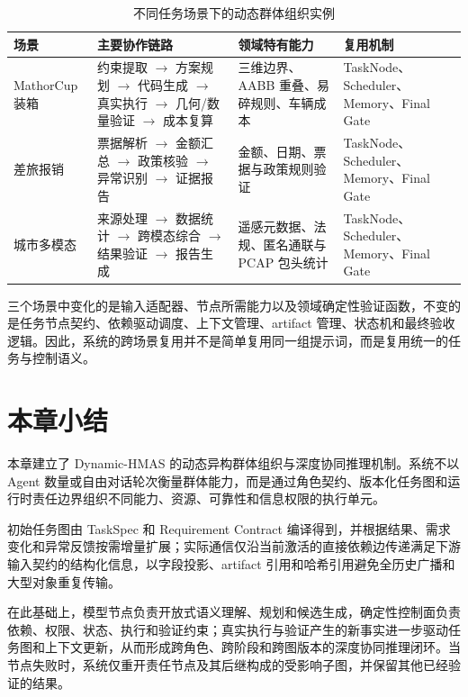 \documentclass[UTF8,a4paper,12pt,oneside]{ctexbook}
\begin{document}
\begin{table}[htbp]
\centering
\caption{不同任务场景下的动态群体组织实例}
\label{tab:cross-domain-role-example}
\begin{tabular}{@{}>{\raggedright\arraybackslash}p{}>{\raggedright\arraybackslash}p{}>{\raggedright\arraybackslash}p{}>{\raggedright\arraybackslash}p{}@{}}
\toprule
场景 & 主要协作链路 & 领域特有能力 & 复用机制\\
\midrule
MathorCup 装箱
&
约束提取 $\rightarrow$ 方案规划 $\rightarrow$ 代码生成 $\rightarrow$ 真实执行 $\rightarrow$ 几何/数量验证 $\rightarrow$ 成本复算
&
三维边界、AABB 重叠、易碎规则、车辆成本
&
TaskNode、Scheduler、Memory、Final Gate
\\

差旅报销
&
票据解析 $\rightarrow$ 金额汇总 $\rightarrow$ 政策核验 $\rightarrow$ 异常识别 $\rightarrow$ 证据报告
&
金额、日期、票据与政策规则验证
&
TaskNode、Scheduler、Memory、Final Gate
\\

城市多模态
&
来源处理 $\rightarrow$ 数据统计 $\rightarrow$ 跨模态综合 $\rightarrow$ 结果验证 $\rightarrow$ 报告生成
&
遥感元数据、法规、匿名通联与 PCAP 包头统计
&
TaskNode、Scheduler、Memory、Final Gate
\\
\bottomrule
\end{tabular}
\end{table}

三个场景中变化的是输入适配器、节点所需能力以及领域确定性验证函数，不变的是任务节点契约、依赖驱动调度、上下文管理、artifact 管理、状态机和最终验收逻辑。因此，系统的跨场景复用并不是简单复用同一组提示词，而是复用统一的任务与控制语义。


\section{本章小结}

本章建立了 Dynamic-HMAS 的动态异构群体组织与深度协同推理机制。系统不以 Agent 数量或自由对话轮次衡量群体能力，而是通过角色契约、版本化任务图和运行时责任边界组织不同能力、资源、可靠性和信息权限的执行单元。

初始任务图由 TaskSpec 和 Requirement Contract 编译得到，并根据结果、需求变化和异常反馈按需增量扩展；实际通信仅沿当前激活的直接依赖边传递满足下游输入契约的结构化信息，以字段投影、artifact 引用和哈希引用避免全历史广播和大型对象重复传输。

在此基础上，模型节点负责开放式语义理解、规划和候选生成，确定性控制面负责依赖、权限、状态、执行和验证约束；真实执行与验证产生的新事实进一步驱动任务图和上下文更新，从而形成跨角色、跨阶段和跨图版本的深度协同推理闭环。当节点失败时，系统仅重开责任节点及其后继构成的受影响子图，并保留其他已经验证的结果。
\end{document}
